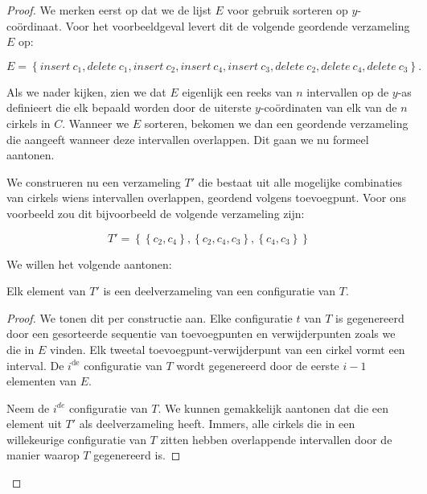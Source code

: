 \begin{proof}
We merken eerst op dat we de lijst $E$ voor gebruik sorteren op
$y$-co\"ordinaat. Voor het voorbeeldgeval levert dit de volgende
geordende verzameling $E$ op: 

\[E = \left\{insert\ c_1, delete\ c_1,
insert\ c_2, insert\ c_4, insert\ c_3, delete\ c_2, delete\ c_4,
delete\ c_3 \right\}.\]

Als we nader kijken, zien we dat $E$ eigenlijk een reeks van $n$
intervallen op de $y$-as definieert die elk bepaald worden door de
uiterste $y$-co\"ordinaten van elk van de $n$ cirkels in $C$. Wanneer
we $E$ sorteren, bekomen we dan een geordende verzameling die aangeeft
wanneer deze intervallen overlappen. Dit gaan we nu formeel aantonen.

We construeren nu een verzameling $T'$ die bestaat uit alle mogelijke
combinaties van cirkels wiens intervallen overlappen, geordend volgens
toevoegpunt. Voor ons voorbeeld zou dit bijvoorbeeld de volgende
verzameling zijn:

\[T' = \left\{\left\{c_2,c_4\right\},\left\{c_2,c_4,c_3\right\},\left\{c_4,c_3\right\}\right\}\]

We willen het volgende aantonen:

\begin{lemma}
Elk element van $T'$ is een deelverzameling van een configuratie van $T$.
\label{lemma:intervals}
\end{lemma}
\begin{proof}
We tonen dit per constructie aan. Elke configuratie $t$ van $T$ is
gegenereerd door een gesorteerde sequentie van toevoegpunten en
verwijderpunten zoals we die in $E$ vinden. Elk tweetal
toevoegpunt-verwijderpunt van een cirkel vormt een interval. De
$i^{\textrm{de}}$ configuratie van $T$ wordt gegenereerd door de
eerste $i - 1$ elementen van $E$. 

Neem de $i^{de}$ configuratie van $T$. We kunnen gemakkelijk aantonen
dat die een element uit $T'$ als deelverzameling heeft. Immers, alle
cirkels die in een willekeurige configuratie van $T$ zitten hebben
overlappende intervallen door de manier waarop $T$ gegenereerd is.




\end{proof}
\end{proof}
